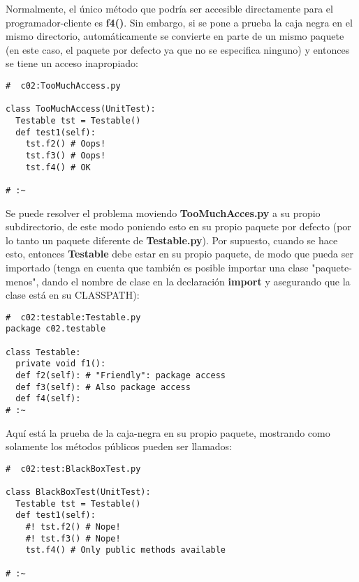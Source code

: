 Normalmente, el único método que podría ser accesible directamente para el programador-cliente es \textbf{f4()}. Sin embargo, si se pone a prueba la caja negra en el mismo directorio, automáticamente se convierte en parte de un mismo paquete (en este caso, el paquete por defecto ya que no se especifica ninguno) y entonces se tiene un acceso inapropiado:  \newline 

\begin{lstlisting}
#  c02:TooMuchAccess.py 

class TooMuchAccess(UnitTest): 
  Testable tst = Testable() 
  def test1(self): 
    tst.f2() # Oops! 
    tst.f3() # Oops! 
    tst.f4() # OK 
    
# :~ 
\end{lstlisting}

Se puede resolver el problema moviendo \textbf{TooMuchAcces.py} a su propio subdirectorio, de este modo poniendo esto en su propio paquete por defecto (por lo tanto un paquete diferente de \textbf{Testable.py}). Por supuesto, cuando se hace esto, entonces \textbf{Testable} debe estar en su propio paquete, de modo que pueda ser importado (tenga en cuenta que también es posible importar una clase "paquete-menos", dando el nombre de clase en la declaración \textbf{import} y asegurando que la clase está en su CLASSPATH):     \newline

\begin{lstlisting}
#  c02:testable:Testable.py 
package c02.testable 

class Testable: 
  private void f1(): 
  def f2(self): # "Friendly": package access 
  def f3(self): # Also package access 
  def f4(self): 
# :~ 
\end{lstlisting}

Aquí está la prueba de la caja-negra en su propio paquete, mostrando como solamente los métodos públicos pueden ser llamados:   \newline  \newline

\begin{lstlisting}
#  c02:test:BlackBoxTest.py 

class BlackBoxTest(UnitTest): 
  Testable tst = Testable() 
  def test1(self): 
    #! tst.f2() # Nope! 
    #! tst.f3() # Nope! 
    tst.f4() # Only public methods available 
    
# :~ 
\end{lstlisting}

